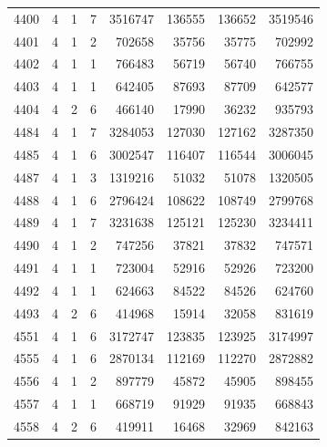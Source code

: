 \begin{longtable}{rrrrrrrr}
4400 & 4 & 1 & 7 & 3516747 & 136555 & 136652 & 3519546\\
4401 & 4 & 1 & 2 & 702658 & 35756 & 35775 & 702992\\
4402 & 4 & 1 & 1 & 766483 & 56719 & 56740 & 766755\\
4403 & 4 & 1 & 1 & 642405 & 87693 & 87709 & 642577\\
4404 & 4 & 2 & 6 & 466140 & 17990 & 36232 & 935793\\
4484 & 4 & 1 & 7 & 3284053 & 127030 & 127162 & 3287350\\
4485 & 4 & 1 & 6 & 3002547 & 116407 & 116544 & 3006045\\
4487 & 4 & 1 & 3 & 1319216 & 51032 & 51078 & 1320505\\
4488 & 4 & 1 & 6 & 2796424 & 108622 & 108749 & 2799768\\
4489 & 4 & 1 & 7 & 3231638 & 125121 & 125230 & 3234411\\
4490 & 4 & 1 & 2 & 747256 & 37821 & 37832 & 747571\\
4491 & 4 & 1 & 1 & 723004 & 52916 & 52926 & 723200\\
4492 & 4 & 1 & 1 & 624663 & 84522 & 84526 & 624760\\
4493 & 4 & 2 & 6 & 414968 & 15914 & 32058 & 831619\\
4551 & 4 & 1 & 6 & 3172747 & 123835 & 123925 & 3174997\\
4555 & 4 & 1 & 6 & 2870134 & 112169 & 112270 & 2872882\\
4556 & 4 & 1 & 2 & 897779 & 45872 & 45905 & 898455\\
4557 & 4 & 1 & 1 & 668719 & 91929 & 91935 & 668843\\
4558 & 4 & 2 & 6 & 419911 & 16468 & 32969 & 842163\\
\bottomrule\end{longtable}\normalsize
\clearpage
